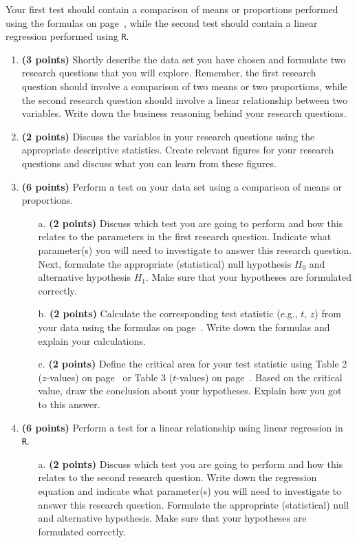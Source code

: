 Your first test should contain a comparison of means or proportions performed using the formulas on page~\pageref{formulasheet}, while the second test should contain a linear regression performed using \texttt{R}. \\

\begin{enumerate}
    \item \textbf{(3 points)} Shortly describe the data set you have chosen and formulate two research questions that you will explore. Remember, the first research question should involve a comparison of two means or two proportions, while the second research question should involve a linear relationship between two variables. Write down the business reasoning behind your research questions. 
    \item \textbf{(2 points)} Discuss the variables in your research questions using the appropriate descriptive statistics. Create relevant figures for your research questions and discuss what you can learn from these figures. 
    \item \textbf{(6 points)} Perform a test on your data set using a comparison of means or proportions.
    \begin{enumerate}
        \item[a.] \textbf{(2 points)} Discuss which test you are going to perform and how this relates to the parameters in the first research question. Indicate what parameter(s) you will need to investigate to answer this research question. Next, formulate the appropriate (statistical) null hypothesis $H_0$ and alternative hypothesis $H_1$. Make sure that your hypotheses are formulated correctly.
        \item[b.] \textbf{(2 points)} Calculate the corresponding test statistic (e.g., $t$, $z$) from your data using the formulas on page~\pageref{formulasheet}. Write down the formulas and explain your calculations. 
        \item[c.] \textbf{(2 points)} Define the critical area for your test statistic using Table 2 ($z$-values) on page~\pageref{table2} or Table 3 ($t$-values) on page~\pageref{table3}. Based on the critical value, draw the conclusion about your hypotheses. Explain how you got to this answer.
    \end{enumerate}
    \item \textbf{(6 points)} Perform a test for a linear relationship using linear regression in \texttt{R}.
    \begin{enumerate}
        \item[a.] \textbf{(2 points)} Discuss which test you are going to perform and how this relates to the second research question. Write down the regression equation and indicate what parameter(s) you will need to investigate to answer this research question. Formulate the appropriate (statistical) null and alternative hypothesis. Make sure that your hypotheses are formulated correctly.

\end{enumerate}
\end{enumerate}
